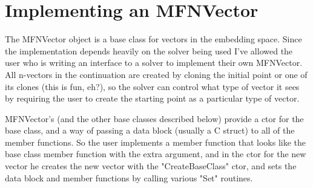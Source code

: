 \documentclass[12pt]{article}
\begin{document}
\section{Implementing an MFNVector}

The {MFNVector} object is a base class for vectors in the embedding space. Since the implementation
depends heavily on the solver being used I've allowed the user who is writing an interface to a solver
to implement their own {MFNVector}. All n-vectors in the continuation are created by cloning the
initial point or one of its clones (this is fun, eh?), so the solver can control what type of vector
it sees by requiring the user to create the starting point as a particular type of vector.

{MFNVector}'s (and the other base classes described below) provide a ctor for the base class, and
a way of passing a data block (usually a C struct) to all of the member functions. So the user
implements a member function that looks like the base class member function with the extra argument,
and in the ctor for the new vector he creates the new vector with the "CreateBaseClass" ctor, and
sets the data block and member functions by calling various "Set" routines.
\end{document}
